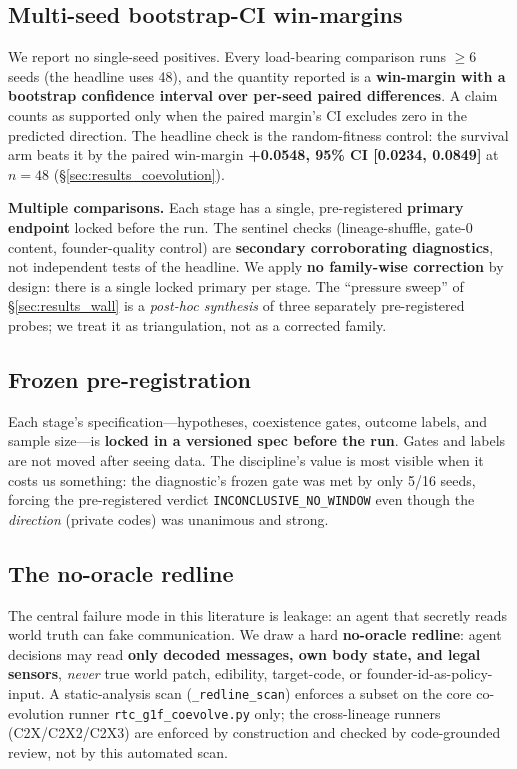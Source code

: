 \documentclass[12pt,letterpaper]{article}
\begin{document}
\subsection{Multi-seed bootstrap-CI win-margins}

We report no single-seed positives. Every load-bearing comparison runs $\geq 6$ seeds (the
headline uses 48), and the quantity reported is a \textbf{win-margin with a bootstrap
confidence interval over per-seed paired differences}. A claim counts as supported only
when the paired margin's CI excludes zero in the predicted direction. The headline check is
the random-fitness control: the survival arm beats it by the paired win-margin
\textbf{+0.0548, 95\% CI [0.0234, 0.0849]} at $n{=}48$ (\S\ref{sec:results_coevolution}).

\textbf{Multiple comparisons.} Each stage has a single, pre-registered \textbf{primary
endpoint} locked before the run. The sentinel checks (lineage-shuffle, gate-0 content,
founder-quality control) are \textbf{secondary corroborating diagnostics}, not independent
tests of the headline. We apply \textbf{no family-wise correction} by design: there is a
single locked primary per stage. The ``pressure sweep'' of \S\ref{sec:results_wall} is a
\emph{post-hoc synthesis} of three separately pre-registered probes; we treat it as
triangulation, not as a corrected family.

\subsection{Frozen pre-registration}

Each stage's specification---hypotheses, coexistence gates, outcome labels, and sample
size---is \textbf{locked in a versioned spec before the run}. Gates and labels are not moved
after seeing data. The discipline's value is most visible when it costs us something: the
diagnostic's frozen gate was met by only 5/16 seeds, forcing the pre-registered verdict
\texttt{INCONCLUSIVE\_NO\_WINDOW} even though the \emph{direction} (private codes) was
unanimous and strong.

\subsection{The no-oracle redline}

The central failure mode in this literature is leakage: an agent that secretly reads world
truth can fake communication. We draw a hard \textbf{no-oracle redline}: agent decisions
may read \textbf{only decoded messages, own body state, and legal sensors}, \emph{never}
true world patch, edibility, target-code, or founder-id-as-policy-input. A static-analysis
scan (\texttt{\_redline\_scan}) enforces a subset on the core co-evolution runner
\texttt{rtc\_g1f\_coevolve.py} only; the cross-lineage runners (C2X/C2X2/C2X3) are enforced
by construction and checked by code-grounded review, not by this automated scan.
\end{document}

